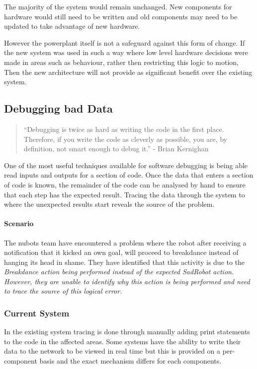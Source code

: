 \documentclass[english,12pt]{scrartcl}
\begin{document}
				The majority of the system would remain unchanged. New components for hardware would still need to be written and old components may need to be updated to take advantage of new hardware.
				
				However the \gls{powerplant} itself is not a safeguard against this form of change. If the new system was used in such a way where low level hardware decisions were made in areas such as behaviour, rather then restricting this logic to motion, Then the new architecture will not provide as significant benefit over the existing system.

		\subsection{Debugging bad Data}
			\begin{quote}``Debugging is twice as hard as writing the code in the first place. Therefore, if you write the code as cleverly as possible, you are, by definition, not smart enough to debug it.'' - Brian Kernighan\end{quote}
			One of the most useful techniques available for software debugging is being able read inputs and outputs for a section of code. Once the data that enters a section
			of code is known, the remainder of the code can be analysed by hand to ensure that each
			step has the expected result. Tracing the data through the system to where the unexpected results start reveals the source of the problem.

			\paragraph{Scenario} The \gls{nubots} team have encountered a problem where the robot after
			receiving a notification that it kicked an own goal, will proceed to breakdance instead
			of hanging its head in shame. They have identified that this activity is due to the
			\em{Breakdance} action being performed instead of the expected \em{SadRobot} action. However, they are unable to identify why this action is being performed and need to trace the source
			of this logical error.

			\subsubsection{Current System}
				In the existing system tracing is done through manually adding print statements to the code in the affected areas.
				Some systems have the ability to write their data to the network to be viewed in real time but this is provided on a per-component basis and the exact mechanism differs for each components.
				
\end{document}
